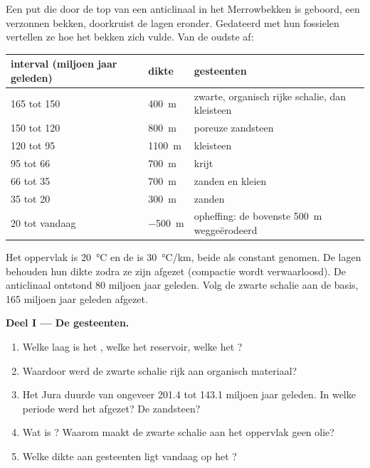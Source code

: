 \begin{problem}
\label{pb:g11:fossil-fuel-geology:1}
Een put die door de top van een anticlinaal in het Merrowbekken is geboord, een
verzonnen bekken, doorkruist de lagen eronder. Gedateerd met hun fossielen
vertellen ze hoe het bekken zich vulde. Van de oudste af:
\begin{center}
\small
\begin{tabular}{|l|l|l|}
\hline
\textbf{interval (miljoen jaar geleden)} & \textbf{dikte} & \textbf{gesteenten} \\
\hline
165 tot 150 & \qty{400}{m} & zwarte, organisch rijke schalie, dan kleisteen \\
150 tot 120 & \qty{800}{m} & poreuze zandsteen \\
120 tot 95 & \qty{1100}{m} & kleisteen \\
95 tot 66 & \qty{700}{m} & krijt \\
66 tot 35 & \qty{700}{m} & zanden en kleien \\
35 tot 20 & \qty{300}{m} & zanden \\
20 tot vandaag & \qty{-500}{m} & opheffing: de bovenste \qty{500}{m} weggeërodeerd \\
\hline
\end{tabular}
\end{center}
Het oppervlak is \qty{20}{\degreeCelsius} en de  is
\qty{30}{\degreeCelsius/km}, beide als constant genomen. De lagen behouden hun
dikte zodra ze zijn afgezet (compactie wordt verwaarloosd). De anticlinaal ontstond 80
miljoen jaar geleden. Volg de zwarte schalie aan de basis, 165 miljoen
jaar geleden afgezet.

\medskip
\noindent\textbf{Deel I --- De gesteenten.}
\begin{enumerate}
  \item Welke laag is het , welke het reservoir, welke het ?
  \item Waardoor werd de zwarte schalie rijk aan organisch materiaal?
  \item Het Jura duurde van ongeveer \num{201.4} tot \num{143.1} miljoen
        jaar geleden. In welke periode werd het  afgezet? De
        zandsteen?
  \item Wat is ? Waarom maakt de zwarte schalie aan het oppervlak geen
        olie?
  \item Welke dikte aan gesteenten ligt vandaag op het ?
\end{enumerate}


\end{problem}
